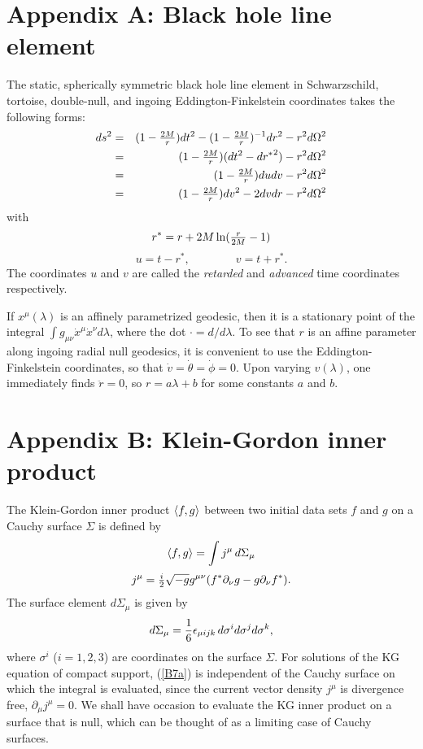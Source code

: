 \section*{Appendix A: Black hole line element}

The static, spherically symmetric black hole line element
in Schwarzschild, tortoise, double-null, and ingoing
Eddington-Finkelstein coordinates takes the following forms:
\begin{eqnarray} ds^2&=
&(1-{\textstyle{2M\over r}}) dt^2
-(1-{\textstyle{2M\over r}})^{-1} dr^2
-r^2d\Omega^2\\
&=&(1-{\textstyle{2M\over r}}) (dt^2-d{r^*}^2)-r^2d\Omega^2\\
&=&(1-{\textstyle{2M\over r}}) dudv- r^2d\Omega^2\\
&=& (1-{\textstyle{2M\over r}}) dv^2-2 dvdr-r^2d\Omega^2
\end{eqnarray}
with
\begin{equation}
r^*=r+2M\ln({\textstyle{r\over2M}}-1)
\label{tortoise}
\end{equation}
\begin{equation}u=t-r^*,\qquad\qquad v=t+r^*.
\label{uv}
\end{equation}
The coordinates $u$ and $v$ are called the {\it retarded} and
{\it advanced} time coordinates respectively.

If $x^{\mu}(\lambda)$ is an affinely parametrized
geodesic, then it is a stationary point of the integral
$\int g_{\mu\nu}\dot{x}^{\mu}\dot{x}^{\nu} d\lambda$, where
the dot $\cdot=d/d\lambda$.
To see that $r$ is an affine parameter along ingoing radial
null geodesics, it is convenient to use the
Eddington-Finkelstein coordinates, so that
$\dot{v}=\dot{\theta}=\dot{\phi}=0$. Upon varying
$v(\lambda)$, one immediately finds $\ddot{r}=0$,
so $r=a\lambda+b$ for some constants $a$
and $b$.

\section*{Appendix B: Klein-Gordon inner product}

The Klein-Gordon inner product $\langle f,g\rangle$ between two
initial data sets $f$ and $g$ on a Cauchy
surface $\Sigma$ is defined by
\begin{equation}
\langle f,g\rangle=\int j^\mu \, d\Sigma_{\mu}
\label{B7a}
\end{equation}
\begin{equation}
j^\mu= {\textstyle {i\over2}}\sqrt{-g}g^{\mu\nu}(f^*\partial_\nu
g-g\partial_\nu f^*).
\end{equation}
The surface element $d\Sigma_\mu$ is given by
\begin{equation}
d\Sigma_\mu={1\over6}\epsilon_{\mu ijk}\, d\sigma^i
d\sigma^j d\sigma^k,
\end{equation}
where $\sigma^i$ ($i=1,2,3$) are coordinates on the surface
$\Sigma$. For solutions of the KG equation of compact
support, (\ref{B7a}) is independent of the Cauchy surface on which
the integral is evaluated, since the current vector density
$j^\mu$ is divergence free, $\partial_\mu j^\mu=0$.
We shall have occasion to evaluate the KG inner product on a
surface that is null, which can be thought of as a limiting
case of Cauchy surfaces.

